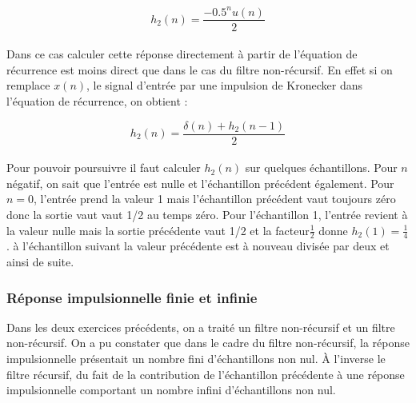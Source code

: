 \documentclass[11pt,a4paper]{article}
\begin{document}
\[h_2(n) = \frac{-0.5^n u(n)}{2}\]\\

Dans ce cas calculer cette réponse directement à partir de l'équation de récurrence est moins direct que dans le cas du filtre non-récursif. En effet si on remplace $x(n)$, le signal d'entrée par une impulsion de Kronecker dans l'équation de récurrence, on obtient :

\[h_2(n) = \frac{\delta(n) + h_2(n-1)}{2}\]\\

Pour pouvoir poursuivre il faut calculer $h_2(n)$ sur quelques échantillons. Pour $n$ négatif, on sait que l'entrée est nulle et l'échantillon précédent également. Pour $n=0$, l'entrée prend la valeur 1 mais l'échantillon précédent vaut toujours zéro donc la sortie vaut vaut 1/2 au temps zéro. Pour l'échantillon 1, l'entrée revient à la valeur nulle mais la sortie précédente vaut 1/2 et la facteur$ \frac{1}{2}$ donne $h_2(1) = \frac{1}{4}$. à l'échantillon suivant la valeur précédente est à nouveau divisée par deux et ainsi de suite.

\begin{center}
\end{center}

\subsubsection{Réponse impulsionnelle finie et infinie}
Dans les deux exercices précédents, on a traité un filtre non-récursif et un filtre non-récursif. On a pu constater que dans le cadre du filtre non-récursif, la réponse impulsionnelle présentait un nombre fini d'échantillons non nul. \`A l'inverse le filtre récursif, du fait de la contribution de l'échantillon précédente à une réponse impulsionnelle comportant un nombre infini d'échantillons non nul.\\
\end{document}
